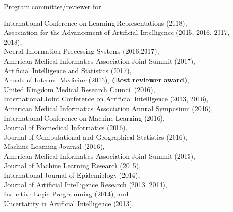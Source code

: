 Program committee/reviewer for: \vspace*{-0.5em}
\begin{tabbing}
\hspace*{2em}\= International Conference on Learning Representations (2018),\\
\> Association for the Advancement of Artificial Intelligence (2015, 2016, 2017, 2018),\\
\> Neural Information Processing Systems (2016,2017),\\
\> American Medical Informatics Association Joint Summit (2017),\\
\> Artificial Intelligence and Statistics (2017),\\
\> Annals of Internal Medicine (2016), \textbf{(Best reviewer award)},\\
\> United Kingdom Medical Research Council (2016),\\
\> International Joint Conference on Artificial Intelligence (2013, 2016),\\
\> American Medical Informatics Association Annual Symposium (2016),\\
\> International Conference on Machine Learning (2016),\\
\> Journal of Biomedical Informatics (2016), \\
\> Journal of Computational and Geographical Statistics (2016),\\
\> Machine Learning Journal (2016),\\
\> American Medical Informatics Association Joint Summit (2015),\\
\> Journal of Machine Learning Research (2015),\\
\> International Journal of Epidemiology (2014),\\
\> Journal of Artificial Intelligence Research (2013, 2014),\\
\> Inductive Logic Programming (2014), and \\
\> Uncertainty in Artificial Intelligence (2013).
\end{tabbing}


